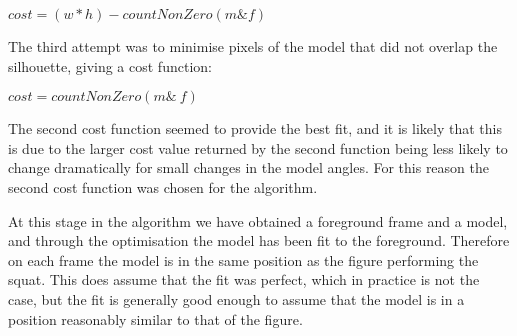 \centerline{$cost = (w * h) - countNonZero(m \& f)$}

The third attempt was to minimise pixels of the model that did not overlap the silhouette, giving a cost function:

\centerline{$cost = countNonZero(m \& ~f)$}

The second cost function seemed to provide the best fit, and it is likely that this is due to the larger cost value returned by the second function being less likely to change dramatically for small changes in the model angles. For this reason the second cost function was chosen for the algorithm.

At this stage in the algorithm we have obtained a foreground frame and a model, and through the optimisation the model has been fit to the foreground. Therefore on each frame the model is in the same position as the figure performing the squat. This does assume that the fit was perfect, which in practice is not the case, but the fit is generally good enough to assume that the model is in a position reasonably similar to that of the figure.